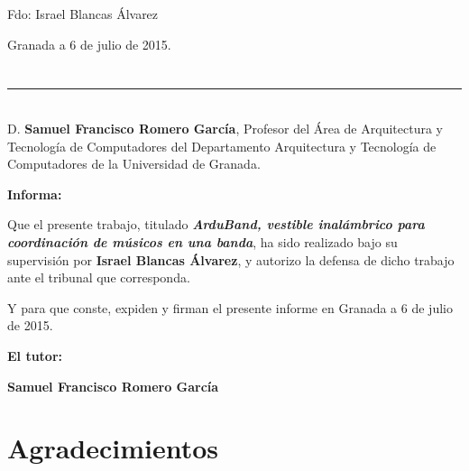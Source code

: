 \vspace{6cm}

\noindent Fdo: Israel Blancas Álvarez

\vspace{2cm}

\begin{flushright}
Granada a 6 de julio de 2015.
\end{flushright}


\chapter*{}
\thispagestyle{empty}

\noindent\rule[-1ex]{\textwidth}{2pt}\\[4.5ex]

D. \textbf{Samuel Francisco Romero García}, Profesor del Área de Arquitectura y Tecnología de Computadores del Departamento Arquitectura y Tecnología de Computadores de la Universidad de Granada.

\vspace{0.5cm}


\vspace{0.5cm}

\textbf{Informa:}

\vspace{0.5cm}

Que el presente trabajo, titulado \textit{\textbf{ArduBand, vestible inalámbrico para coordinación de músicos en una banda}},
ha sido realizado bajo su supervisión por \textbf{Israel Blancas Álvarez}, y autorizo la defensa de dicho trabajo ante el tribunal
que corresponda.

\vspace{0.5cm}

Y para que conste, expiden y firman el presente informe en Granada a 6 de julio de 2015.

\vspace{1cm}

\textbf{El tutor:}

\vspace{5cm}

\noindent \textbf{Samuel Francisco Romero García}

\chapter*{Agradecimientos}
\thispagestyle{empty}

       \vspace{1cm}

